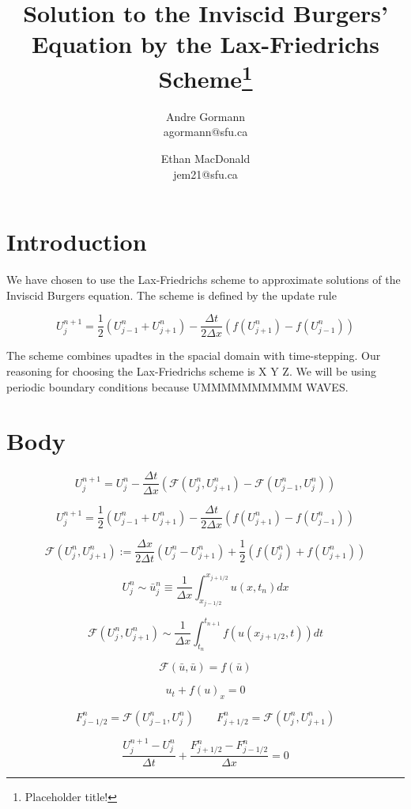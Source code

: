 \documentclass{myproject}
\title{\vspace*{-1cm}Solution to the Inviscid Burgers' Equation by the Lax-Friedrichs Scheme\footnote{Placeholder title!}}
\date{}
\author{
    Andre Gormann\\
    agormann@sfu.ca
    \and
    Ethan MacDonald\\
    jem21@sfu.ca
}
\begin{document}
\maketitle
\vspace*{-1cm}


\section{Introduction}
We have chosen to use the Lax-Friedrichs scheme to approximate solutions of the Inviscid Burgers equation. The scheme is defined by the update rule

\[
    U_j^{n+1} = \frac{1}{2}\left( U_{j-1}^{n} + U_{j+1}^{n} \right) - \frac{\Delta t}{2\Delta x}\left( f(U_{j+1}^{n}) - f(U_{j-1}^{n}) \right)
\]

The scheme combines upadtes in the spacial domain with time-stepping. Our reasoning for choosing the Lax-Friedrichs scheme is X Y Z. We will be using periodic boundary conditions because UMMMMMMMMMM WAVES.

\section{Body}

\[
    U_j^{n+1} = U_j^n - \frac{\Delta t}{\Delta x} \left( \mathcal{F}(U_{j}^{n}, U_{j+1}^{n}) - \mathcal{F}(U_{j-1}^{n}, U_{j}^{n}) \right)
\]

\[
    U_j^{n+1} = \frac{1}{2}\left( U_{j-1}^{n} + U_{j+1}^{n} \right) - \frac{\Delta t}{2\Delta x}\left( f(U_{j+1}^{n}) - f(U_{j-1}^{n}) \right)
\]

\[
    \mathcal{F}(U_j^n, U_{j+1}^n) := \frac{\Delta x}{2 \Delta t}(U_j^n - U_{j+1}^n) + \frac{1}{2}\left( f(U_j^n) + f(U_{j+1}^n) \right)
\]

\[
    U_j^n \sim \bar{u}_j^n \equiv \frac{1}{\Delta x} \int_{x_{j-1/2}}^{x_{j+1/2}} u(x,t_n) dx
\]

\[
    \mathcal{F}(U_j^n, U_{j+1}^n) \sim \frac{1}{\Delta x} \int_{t_n}^{t_{n+1}} f(u(x_{j+1/2}, t)) dt
\]

\[
    \mathcal{F}(\bar{u}, \bar{u}) = f(\bar{u})
\]

\[
    u_t + f(u)_x = 0
\]

\[
    F_{j-1/2}^n = \mathcal{F}(U_{j-1}^n, U_j^n) \qquad F_{j+1/2}^n = \mathcal{F}(U_{j}^n, U_{j+1}^n)
\]

\[
    \frac{U_j^{n+1} - U_j^n}{\Delta t} + \frac{F_{j+1/2}^n - F_{j-1/2}^n}{\Delta x} = 0
\]
\end{document}
